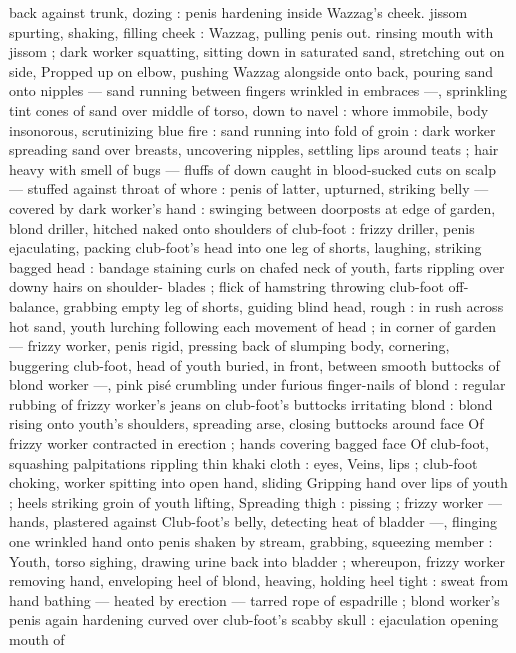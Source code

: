 {back against trunk, dozing : penis hardening inside Wazzag's cheek. 
jissom spurting, shaking, filling cheek : Wazzag, pulling penis out. 
rinsing mouth with jissom ; dark worker squatting, sitting down in 
saturated sand, stretching out on side, Propped up on elbow, 
pushing Wazzag alongside onto back, pouring sand onto nipples --- 
sand running between fingers wrinkled in embraces ---, sprinkling 
tint cones of sand over middle of torso, down to navel : whore 
immobile, body insonorous, scrutinizing blue fire : sand running into 
fold of groin : dark worker spreading sand over breasts, uncovering 
nipples, settling lips around teats ; hair heavy with smell of bugs --- 
fluffs of down caught in blood-sucked cuts on scalp --- stuffed 
against throat of whore : penis of latter, upturned, striking belly --- 
covered by dark worker's hand : swinging between doorposts at edge 
of garden, blond driller, hitched naked onto shoulders of club-foot : 
frizzy driller, penis ejaculating, packing club-foot's head into one leg 
of shorts, laughing, striking bagged head : bandage staining curls on 
chafed neck of youth, farts rippling over downy hairs on shoulder- 
blades ; flick of hamstring throwing club-foot off-balance, grabbing 
empty leg of shorts, guiding blind head, rough : in rush across hot 
sand, youth lurching following each movement of head ; in corner of 
garden --- frizzy worker, penis rigid, pressing back of slumping 
body, cornering, buggering club-foot, head of youth buried, in front, 
between smooth buttocks of blond worker ---, pink pisé crumbling 
under furious finger-nails of blond : regular rubbing of frizzy 
worker's jeans on club-foot's buttocks irritating blond : blond rising 
onto youth's shoulders, spreading arse, closing buttocks around face 
Of frizzy worker contracted in erection ; hands covering bagged face 
Of club-foot, squashing palpitations rippling thin khaki cloth : eyes, 
Veins, lips ; club-foot choking, worker spitting into open hand, sliding 
Gripping hand over lips of youth ; heels striking groin of youth lifting, 
Spreading thigh : pissing ; frizzy worker --- hands, plastered against 
Club-foot's belly, detecting heat of bladder ---, flinging one wrinkled 
hand onto penis shaken by stream, grabbing, squeezing member : 
Youth, torso sighing, drawing urine back into bladder ; whereupon, 
frizzy worker removing hand, enveloping heel of blond, heaving, 
holding heel tight : sweat from hand bathing --- heated by erection 
--- tarred rope of espadrille ; blond worker's penis again hardening 
curved over club-foot's scabby skull : ejaculation opening mouth of 
}
